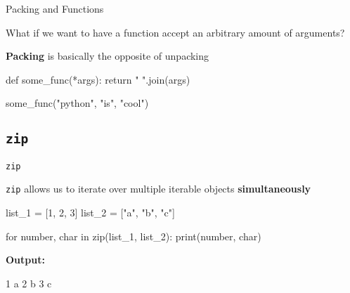 \begin{frame}[fragile]{Packing and Functions}

    \begin{block}{}
        What if we want to have a function accept an arbitrary amount of arguments?
    \end{block}

    \vspace{1em}

    {\bf Packing} is basically the opposite of unpacking

    \vspace{1em}

    \begin{pythoncode}
    def some_func(*args):
        return " ".join(args)

    some_func("python", "is", "cool")
    \end{pythoncode}


\end{frame}

\subsection{{\tt zip}}

\begin{frame}[fragile]{{\tt zip}}

    \begin{block}{}
        {\tt zip} allows us to iterate over multiple iterable objects {\bf simultaneously}
    \end{block}

    \begin{pythoncode}
    list_1 = [1, 2, 3]
    list_2 = ["a", "b", "c"]

    for number, char in zip(list_1, list_2):
        print(number, char)
    \end{pythoncode}

    {\bf Output:}

    \begin{outputcode}
    1 a
    2 b
    3 c
    \end{outputcode}


\end{frame}

